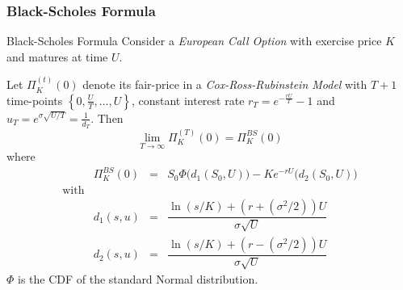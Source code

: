 \documentclass[11pt,a4paper]{article}
\begin{document}
\subsubsection{Black-Scholes Formula}

\begin{theorem}{Black-Scholes Formula}\label{the_black_scholes_formula}
  Consider a \textit{European Call Option} with exercise price $K$ and matures at time $U$.
  \par Let $\Pi_K^{(t)}(0)$ denote its fair-price in a \textit{Cox-Ross-Rubinstein Model} with $T+1$ time-points $\left\{0,\frac{U}T,\dots,U\right\}$, constant interest rate $r_T=e^{-\frac{rU}T}-1$ and $u_T=e^{\sigma\sqrt{U/T}}=\frac1{d_T}$. Then
  \[ \lim_{T\to\infty}\Pi_K^{(T)}(0)=\Pi_K^{BS}(0) \]
  where
  \[\begin{array}{rrcl}
    &\Pi_K^{BS}(0)&=&S_0\Phi\big(d_1(S_0,U)\big)-Ke^{-rU}\big(d_2(S_0,U)\big)\\
    \text{with}\\
    &d_1(s,u)&=&\dfrac{\ln(s/K)+\left(r+(\sigma^2/2)\right)U}{\sigma\sqrt{U}}\\
    &d_2(s,u)&=&\dfrac{\ln(s/K)+\left(r-(\sigma^2/2)\right)U}{\sigma\sqrt{U}}
  \end{array}\]
  $\Phi$ is the CDF of the standard Normal distribution.
\end{theorem}
\end{document}
